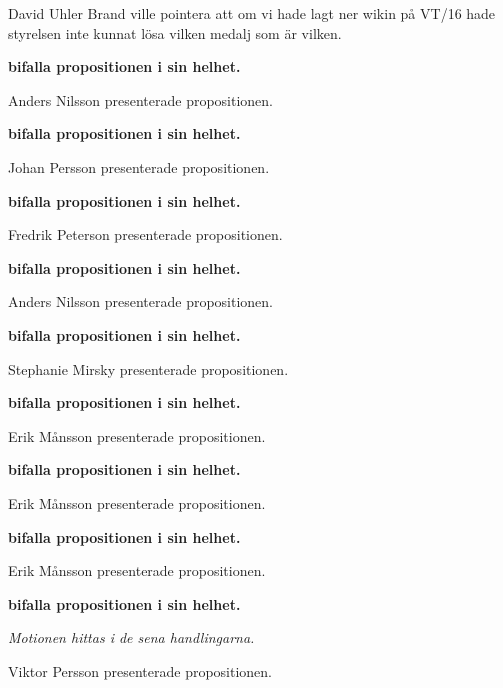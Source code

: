 \documentclass[10pt]{article}
\begin{document}
\begin{paragrafer}
\begin{paragrafer}
        David Uhler Brand ville pointera att om vi hade lagt ner wikin på VT/16 hade styrelsen inte kunnat lösa vilken medalj som är vilken.

        \textbf{\Mba bifalla propositionen i sin helhet.}

        Anders Nilsson presenterade propositionen.

        \textbf{\Mba bifalla propositionen i sin helhet.}

        Johan Persson presenterade propositionen.

        \textbf{\Mba bifalla propositionen i sin helhet.}

        Fredrik Peterson presenterade propositionen.

        \textbf{\Mba bifalla propositionen i sin helhet.}

        Anders Nilsson presenterade propositionen.

        \textbf{\Mba bifalla propositionen i sin helhet.}

        Stephanie Mirsky presenterade propositionen.

        \textbf{\Mba bifalla propositionen i sin helhet.}

        Erik Månsson presenterade propositionen.

        \textbf{\Mba bifalla propositionen i sin helhet.}

        Erik Månsson presenterade propositionen.

        \textbf{\Mba bifalla propositionen i sin helhet.}

        Erik Månsson presenterade propositionen.

        \textbf{\Mba bifalla propositionen i sin helhet.}

    \end{paragrafer}
\emph{Motionen hittas i de sena handlingarna.}

Viktor Persson presenterade propositionen.


\end{paragrafer}
\end{document}
